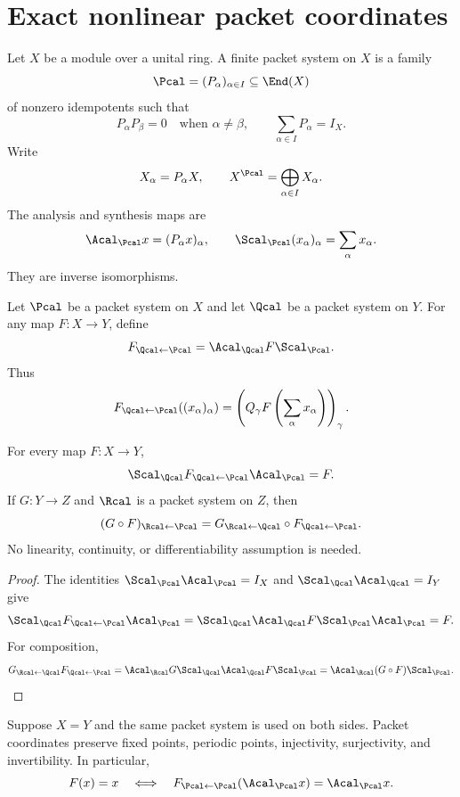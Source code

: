 \section{Exact nonlinear packet coordinates}\label{sec:nonlinear_coordinates}

Let $X$ be a module over a unital ring.  A finite packet system on $X$ is a family
\[
\Pcal=(P_\alpha)_{\alpha\in I}\subseteq\End(X)
\]
of nonzero idempotents such that
\[
P_\alpha P_\beta=0
\quad\text{when }\alpha\ne\beta,
\qquad
\sum_{\alpha\in I}P_\alpha=I_X.
\]
Write
\[
X_\alpha=P_\alpha X,
\qquad
X^{\Pcal}=\bigoplus_{\alpha\in I}X_\alpha.
\]
The analysis and synthesis maps are
\[
\Acal_{\Pcal}x=(P_\alpha x)_\alpha,
\qquad
\Scal_{\Pcal}(x_\alpha)_\alpha=\sum_\alpha x_\alpha.
\]
They are inverse isomorphisms.

\begin{definition}\label{def:nonlinear_packet_map}
Let $\Pcal$ be a packet system on $X$ and let $\Qcal$ be a packet system on $Y$.  For any map $F:X\to Y$, define
\[
F_{\Qcal\leftarrow\Pcal}
=
\Acal_{\Qcal}F\Scal_{\Pcal}.
\]
Thus
\[
F_{\Qcal\leftarrow\Pcal}((x_\alpha)_\alpha)
=
\left(
Q_\gamma F\left(\sum_\alpha x_\alpha\right)
\right)_\gamma.
\]
\end{definition}

\begin{theorem}\label{thm:exact_nonlinear_coordinates}
For every map $F:X\to Y$,
\[
\Scal_{\Qcal}F_{\Qcal\leftarrow\Pcal}\Acal_{\Pcal}=F.
\]
If $G:Y\to Z$ and $\Rcal$ is a packet system on $Z$, then
\[
(G\circ F)_{\Rcal\leftarrow\Pcal}
=
G_{\Rcal\leftarrow\Qcal}
\circ
F_{\Qcal\leftarrow\Pcal}.
\]
No linearity, continuity, or differentiability assumption is needed.
\end{theorem}

\begin{proof}
The identities $\Scal_{\Pcal}\Acal_{\Pcal}=I_X$ and $\Scal_{\Qcal}\Acal_{\Qcal}=I_Y$ give
\[
\Scal_{\Qcal}F_{\Qcal\leftarrow\Pcal}\Acal_{\Pcal}
=
\Scal_{\Qcal}\Acal_{\Qcal}F\Scal_{\Pcal}\Acal_{\Pcal}
=F.
\]
For composition,
\[
G_{\Rcal\leftarrow\Qcal}F_{\Qcal\leftarrow\Pcal}
=
\Acal_{\Rcal}G\Scal_{\Qcal}\Acal_{\Qcal}F\Scal_{\Pcal}
=
\Acal_{\Rcal}(G\circ F)\Scal_{\Pcal}.
\]
\end{proof}

\begin{corollary}\label{cor:dynamical_equivalence}
Suppose $X=Y$ and the same packet system is used on both sides.  Packet coordinates preserve fixed points, periodic points, injectivity, surjectivity, and invertibility.  In particular,
\[
F(x)=x
\quad\Longleftrightarrow\quad
F_{\Pcal\leftarrow\Pcal}(\Acal_{\Pcal}x)=\Acal_{\Pcal}x.
\]
\end{corollary}

